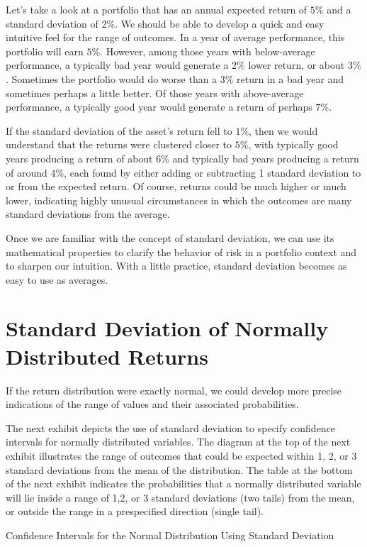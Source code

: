 \documentclass[11pt]{article}
\begin{document}
Let's take a look at a portfolio that has an annual expected return of $5 \%$ and a standard deviation of $2 \%$. We should be able to develop a quick and easy intuitive feel for the range of outcomes. In a year of average performance, this portfolio will earn $5 \%$. However, among those years with below-average performance, a typically bad year would generate a $2 \%$ lower return, or about $3 \%$. Sometimes the portfolio would do worse than a $3 \%$ return in a bad year and sometimes perhaps a little better. Of those years with above-average performance, a typically good year would generate a return of perhaps $7 \%$.

If the standard deviation of the asset's return fell to $1 \%$, then we would understand that the returns were clustered closer to $5 \%$, with typically good years producing a return of about $6 \%$ and typically bad years producing a return of around 4\%, each found by either adding or subtracting 1 standard deviation to or from the expected return. Of course, returns could be much higher or much lower, indicating highly unusual circumstances in which the outcomes are many standard deviations from the average.

Once we are familiar with the concept of standard deviation, we can use its mathematical properties to clarify the behavior of risk in a portfolio context and to sharpen our intuition. With a little practice, standard deviation becomes as easy to use as averages.

\section*{Standard Deviation of Normally Distributed Returns}
If the return distribution were exactly normal, we could develop more precise indications of the range of values and their associated probabilities.

The next exhibit depicts the use of standard deviation to specify confidence intervals for normally distributed variables. The diagram at the top of the next exhibit illustrates the range of outcomes that could be expected within 1, 2, or 3 standard deviations from the mean of the distribution. The table at the bottom of the next exhibit indicates the probabilities that a normally distributed variable will lie inside a range of 1,2, or 3 standard deviations (two tails) from the mean, or outside the range in a prespecified direction (single tail).

Confidence Intervals for the Normal Distribution Using Standard Deviation
\end{document}
